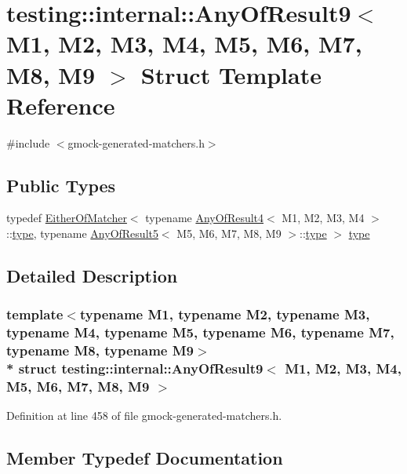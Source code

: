 \hypertarget{structtesting_1_1internal_1_1_any_of_result9}{}\section{testing\+:\+:internal\+:\+:Any\+Of\+Result9$<$ M1, M2, M3, M4, M5, M6, M7, M8, M9 $>$ Struct Template Reference}
\label{structtesting_1_1internal_1_1_any_of_result9}


{\ttfamily \#include $<$gmock-\/generated-\/matchers.\+h$>$}

\subsection*{Public Types}
\begin{DoxyCompactItemize}
\item 
typedef \hyperlink{classtesting_1_1internal_1_1_either_of_matcher}{Either\+Of\+Matcher}$<$ typename \hyperlink{structtesting_1_1internal_1_1_any_of_result4}{Any\+Of\+Result4}$<$ M1, M2, M3, M4 $>$\+::\hyperlink{structtesting_1_1internal_1_1_any_of_result9_a308935fb02c62f502044dcc7b0a2b464}{type}, typename \hyperlink{structtesting_1_1internal_1_1_any_of_result5}{Any\+Of\+Result5}$<$ M5, M6, M7, M8, M9 $>$\+::\hyperlink{structtesting_1_1internal_1_1_any_of_result9_a308935fb02c62f502044dcc7b0a2b464}{type} $>$ \hyperlink{structtesting_1_1internal_1_1_any_of_result9_a308935fb02c62f502044dcc7b0a2b464}{type}
\end{DoxyCompactItemize}


\subsection{Detailed Description}
\subsubsection*{template$<$typename M1, typename M2, typename M3, typename M4, typename M5, typename M6, typename M7, typename M8, typename M9$>$\\*
struct testing\+::internal\+::\+Any\+Of\+Result9$<$ M1, M2, M3, M4, M5, M6, M7, M8, M9 $>$}



Definition at line 458 of file gmock-\/generated-\/matchers.\+h.



\subsection{Member Typedef Documentation}
